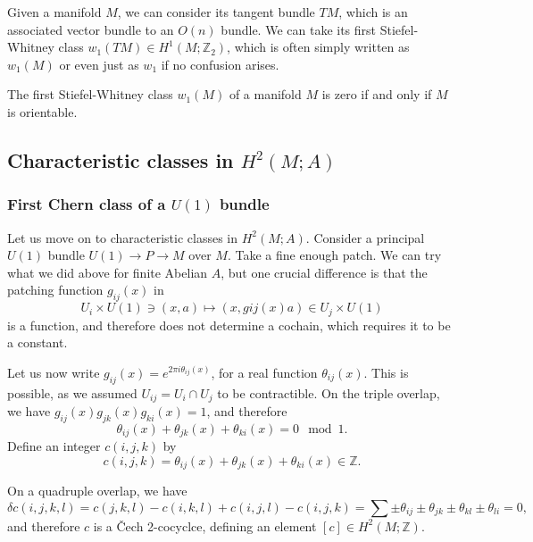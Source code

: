 \documentclass[12pt]{article}
\numberwithin{equation}{section}
\theoremstyle{remark}
\def\bZ{\mathbb{Z}}
\begin{document}
Given a manifold $M$, we can consider its tangent bundle $TM$, which is an associated vector bundle to an $O(n)$ bundle.
We can take its first Stiefel-Whitney class $w_1(TM)\in H^1(M;\bZ_2)$,
which is often simply written as $w_1(M)$ or even just as $w_1$ 
if no confusion arises.

\begin{proposition}
  The first Stiefel-Whitney class $w_1(M)$ of a manifold $M$ is zero if and only if $M$ is orientable.
\end{proposition}

\subsection{Characteristic classes in $H^2(M;A)$}

\subsubsection{First Chern class of a $U(1)$ bundle}

Let us move on to characteristic classes in $H^2(M;A)$.
Consider a principal $U(1)$ bundle $U(1)\to P\to M$ over $M$.
Take a fine enough patch.
We can try what we did above for finite Abelian $A$,
but one crucial difference is that the patching function $g_{ij}(x)$ in \begin{equation}
  U_i\times U(1)\ni (x,a) \mapsto (x,g{ij}(x)a)\in U_j\times U(1)
\end{equation} is a function,
and therefore does not determine a cochain,
which requires it to be a constant.

Let us now write $g_{ij}(x)=e^{2\pi i\theta_{ij}(x)}$, for a real function $\theta_{ij}(x)$.
This is possible, as we assumed $U_{ij}=U_i\cap U_j$ to be contractible.
On the triple overlap, we have $g_{ij}(x)g_{jk}(x)g_{ki}(x)=1$, and therefore \begin{equation}
\theta_{ij}(x)+\theta_{jk}(x)+\theta_{ki}(x) = 0 \mod 1.
\end{equation} Define an integer $c(i,j,k)$ by \begin{equation}
c(i,j,k) = \theta_{ij}(x)+\theta_{jk}(x)+\theta_{ki}(x) \in \bZ.
\end{equation}

On a quadruple overlap, we have \begin{equation}
  \delta c(i,j,k,l) = c(j,k,l) - c(i,k,l) + c(i,j,l) - c(i,j,k) 
  = \sum \pm \theta_{ij} \pm \theta_{jk} \pm \theta_{kl} \pm \theta_{li} = 0 ,
\end{equation}
and therefore $c$ is a \v Cech 2-cocyclce, defining an element $[c]\in H^2(M;\bZ)$.
\end{document}
